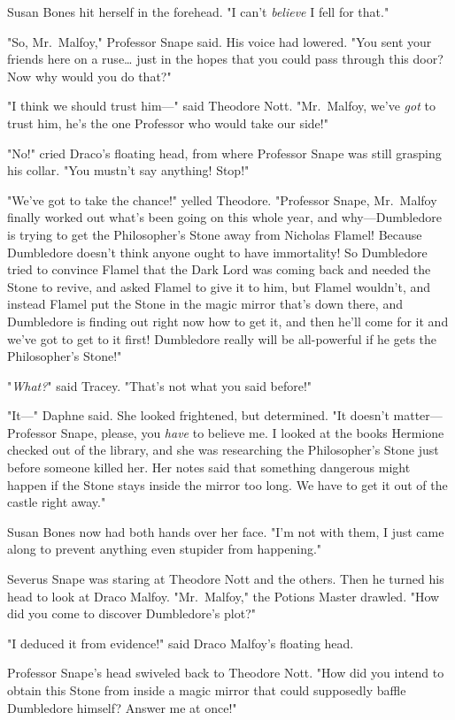 Susan Bones hit herself in the forehead. "I can't \emph{believe} I fell for 
that."

"So, Mr.~Malfoy," Professor Snape said. His voice had lowered. "You sent your 
friends here on a ruse{\ldots} just in the hopes that you could pass through 
this door? Now why would you do that?"

"I think we should trust him---" said Theodore Nott. "Mr.~Malfoy, we've 
\emph{got} to trust him, he's the one Professor who would take our side!"

"No!" cried Draco's floating head, from where Professor Snape was still 
grasping his collar. "You mustn't say anything! Stop!"

"We've got to take the chance!" yelled Theodore. "Professor Snape, Mr.~Malfoy 
finally worked out what's been going on this whole year, and why---Dumbledore 
is trying to get the Philosopher's Stone away from Nicholas Flamel! Because 
Dumbledore doesn't think anyone ought to have immortality! So Dumbledore tried 
to convince Flamel that the Dark Lord was coming back and needed the Stone to 
revive, and asked Flamel to give it to him, but Flamel wouldn't, and instead 
Flamel put the Stone in the magic mirror that's down there, and Dumbledore is 
finding out right now how to get it, and then he'll come for it and we've got 
to get to it first! Dumbledore really will be all-powerful if he gets the 
Philosopher's Stone!"

"\emph{What?}" said Tracey. "That's not what you said before!"

"It---" Daphne said. She looked frightened, but determined. "It doesn't 
matter---Professor Snape, please, you \emph{have} to believe me. I looked at 
the books Hermione checked out of the library, and she was researching the 
Philosopher's Stone just before someone killed her. Her notes said that 
something dangerous might happen if the Stone stays inside the mirror too long. 
We have to get it out of the castle right away."

Susan Bones now had both hands over her face. "I'm not with them, I just came 
along to prevent anything even stupider from happening."

Severus Snape was staring at Theodore Nott and the others. Then he turned his 
head to look at Draco Malfoy. "Mr.~Malfoy," the Potions Master drawled. "How 
did you come to discover Dumbledore's plot?"

"I deduced it from evidence!" said Draco Malfoy's floating head.

Professor Snape's head swiveled back to Theodore Nott. "How did you intend to 
obtain this Stone from inside a magic mirror that could supposedly baffle 
Dumbledore himself? Answer me at once!"

